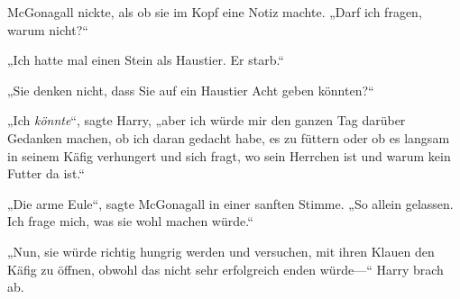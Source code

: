 McGonagall nickte, als ob sie im Kopf eine Notiz machte. „Darf ich fragen, warum nicht?“

„Ich hatte mal einen Stein als Haustier. Er starb.“%

„Sie denken nicht, dass Sie auf ein Haustier Acht geben könnten?“

„Ich \emph{könnte}“, sagte Harry, „aber ich würde mir den ganzen Tag darüber Gedanken machen, ob ich daran gedacht habe, es zu füttern oder ob es langsam in seinem Käfig verhungert und sich fragt, wo sein Herrchen ist und warum kein Futter da ist.“

„Die arme Eule“, sagte McGonagall in einer sanften Stimme. „So allein gelassen. Ich frage mich, was sie wohl machen würde.“

„Nun, sie würde richtig hungrig werden und versuchen, mit ihren Klauen den Käfig zu öffnen, obwohl das nicht sehr erfolgreich enden würde—“ Harry brach ab.

